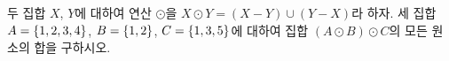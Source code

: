 두 집합 $X$, $Y$에 대하여 연산 $\odot$을 $X\odot Y=(X-Y)\cup(Y-X)$라 하자. 세 집합 $A=\{1{,}\mkern3mu\mathopen{}2{,}\mkern3mu\mathopen{}3{,}\mkern3mu\mathopen{}4\}$, $B=\{1{,}\mkern3mu\mathopen{}2\}$, $C=\{1{,}\mkern3mu\mathopen{}3{,}\mkern3mu\mathopen{}5\}$에 대하여 집합 $(A\odot B)\odot C$의 모든 원소의 합을 구하시오.
